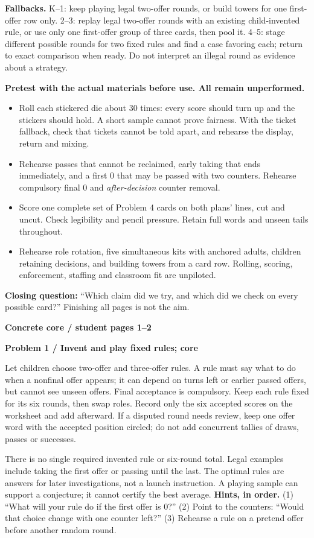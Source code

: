 \documentclass[11pt,letterpaper]{article}
\newcommand{\topic}[1]{\par\textbf{\large #1}\par}
\newcommand{\task}[2]{\par\textbf{Problem #1 / #2}\par}
\newcommand{\hint}[1]{\textbf{Hints, in order.} #1\par}
\begin{document}
\textbf{Fallbacks.} K--1: keep playing legal two-offer rounds, or build
towers for one first-offer row only. 2--3: replay legal two-offer rounds with an existing child-invented rule,
or use only one first-offer group of three cards, then pool it. 4--5: stage
different possible rounds for two fixed rules and find a case favoring each;
return to exact comparison when ready. Do not interpret an illegal round as
evidence about a strategy.

\textbf{Pretest with the actual materials before use. All remain unperformed.}
\begin{itemize}
\item Roll each stickered die about 30 times: every score should turn up and
the stickers should hold. A short sample cannot prove fairness. With the ticket
fallback, check that tickets cannot be told apart, and rehearse the display,
return and mixing.
\item Rehearse passes that cannot be reclaimed, early
taking that ends immediately, and a first $0$ that may be passed with two
counters. Rehearse compulsory final $0$ and \emph{after-decision} counter removal.
\item Score one complete set of Problem 4 cards on both plans' lines, cut and
uncut. Check legibility and pencil pressure. Retain full words and unseen tails
throughout.
\item Rehearse role rotation, five simultaneous kits with anchored adults,
children retaining decisions, and building towers from a card row.
Rolling, scoring, enforcement, staffing and classroom fit are unpiloted.
\end{itemize}
\textbf{Closing question:} ``Which claim did we try, and which did we check on
every possible card?'' Finishing all pages is not the aim.

\newpage
\topic{Concrete core / student pages 1--2}
\task{1}{Invent and play fixed rules; core}
Let children choose two-offer and three-offer rules. A rule must say what to
do when a nonfinal offer appears; it can depend on turns left or earlier passed
offers, but cannot see unseen offers. Final acceptance is compulsory. Keep each
rule fixed for its six rounds, then swap roles. Record only the six accepted
scores on the worksheet and add afterward. If a disputed round needs review,
keep one offer word with the accepted position circled; do not add concurrent
tallies of draws, passes or successes.

There is no single required invented rule or six-round total. Legal examples
include taking the first offer or passing until the last. The optimal rules
are answers for later investigations, not a launch instruction. A playing
sample can support a conjecture; it cannot certify the best average.
\hint{(1) ``What will your rule do if the first offer is $0$?''
(2) Point to the counters: ``Would that choice change with one
counter left?'' (3) Rehearse a rule on a pretend offer before another random round.}
\end{document}
